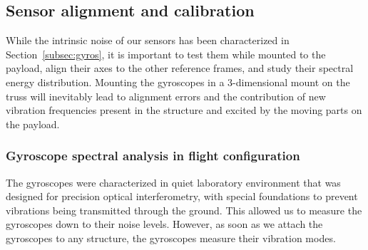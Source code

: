 \subsection{Sensor alignment and calibration}
While the intrinsic noise of our sensors has been characterized in Section~\ref{subsec:gyros}, it is important to test them while mounted to the payload, align their axes to the other reference frames, and study their spectral energy distribution. Mounting the gyroscopes in a 3-dimensional mount on the truss will inevitably lead to alignment errors and the contribution of new vibration frequencies present in the structure and excited by the moving parts on the payload.


\subsubsection{Gyroscope spectral analysis in flight configuration}

The gyroscopes were characterized in quiet laboratory environment that was designed for precision optical interferometry, with special foundations to prevent vibrations being transmitted through the ground. This allowed us to measure the gyroscopes down to their noise levels. However, as soon as we attach the gyroscopes to any structure, the gyroscopes measure their vibration modes. 

